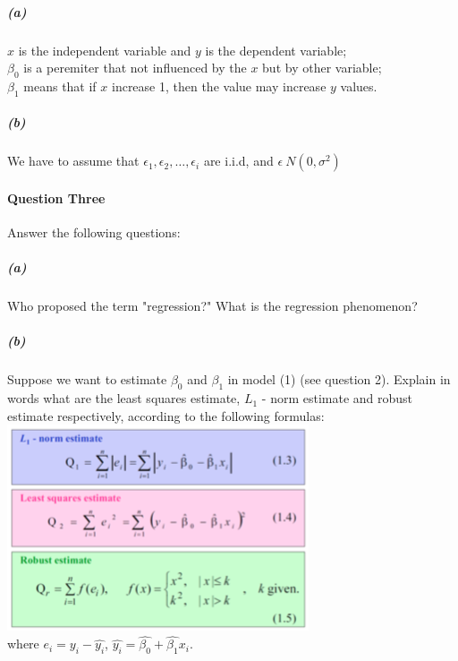 \documentclass[UTF8]{article}
\begin{document}
  \paragraph{\color{red}{Answer:}}
    \subparagraph{(a)}
      $x$ is the independent variable and $y$ is the dependent variable; \\
      $\beta_0$ is a peremiter that not influenced by the $x$ but by other variable; \\
      $\beta_1$ means that if $x$ increase 1, then the value may increase $y$ values.
    \subparagraph{(b)}
      We have to assume that $\epsilon_1, \epsilon_2,\dots,\epsilon_i$ are i.i.d, and
      $\epsilon~N(0,\sigma^2)$
  \\

  \paragraph{Question Three}
    Answer the following questions:
  \subparagraph{(a)}
    Who proposed the term "regression?" What is the regression phenomenon?
  \subparagraph{(b)}
    Suppose we want to estimate $\beta_0$ and $\beta_1$ in model (1) (see question 2).
    Explain in words what are the least squares estimate,
    $L_1$ - norm estimate and robust estimate respectively, according to the following formulas:\\
    \includegraphics[width = .8\textwidth]{Q3.png} \\
    where $e_i = y_i - \hat{y_i}$, $\hat{y_i} = \hat{\beta_0} + \hat{\beta_1}x_i$.
\end{document}
